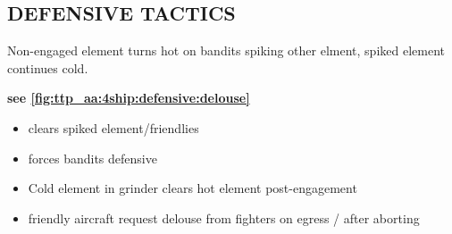 \clearpage

\subsection{DEFENSIVE TACTICS}

\begin{tcoloritemize}
    \blueitem[Delouse] 
    Non-engaged element turns hot on bandits spiking other elment,
    spiked element continues cold.

    \hfill\textbf{see \cref{fig:ttp_aa:4ship:defensive:delouse}}
    \begin{itemize}
        \item clears spiked element/friendlies
        \item forces bandits defensive
    \end{itemize}

    \begin{itemize}
        \item Cold element in grinder clears hot element post-engagement
        \item friendly aircraft request delouse from fighters on egress / after aborting
    \end{itemize}
\end{tcoloritemize}


